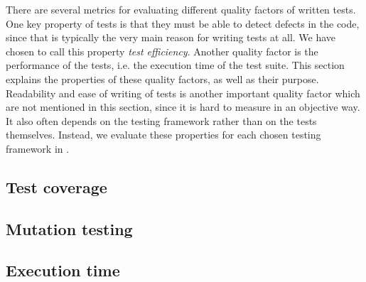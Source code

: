 
There are several metrics for evaluating different quality factors of
written tests. One key property of tests is that they must be able to
detect defects in the code, since that is typically the very main reason
for writing tests at all. We have chosen to call this property
\emph{test efficiency}. Another quality factor is the performance of the
tests, i.e. the execution time of the test suite. This section explains
the properties of these quality factors, as well as their purpose.\\

Readability and ease of writing of tests is another important quality
factor which are not mentioned in this section, since it is hard to
measure in an objective way. It also often depends on the testing
framework rather than on the tests themselves. Instead, we evaluate
these properties for each chosen testing framework in
.\\

\subsection{Test coverage}
\label{sec:coverage}


\subsection{Mutation testing}
\label{sec:theory_mutation}


\subsection{Execution time}

